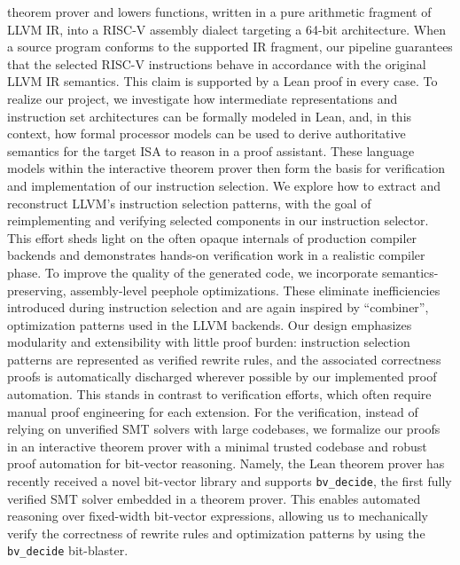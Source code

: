 \documentclass[review, anonymous, acmsmall, screen]{acmart}
\begin{document}
theorem prover and lowers functions, written in a pure arithmetic fragment of LLVM IR, into a RISC-V
assembly dialect targeting a 64-bit architecture.  When a source program conforms to the supported
IR fragment, our pipeline guarantees that the selected RISC-V instructions behave in accordance 
with the original LLVM IR semantics. This claim is supported by a Lean proof in every case. To realize our project, we investigate how intermediate representations and instruction set 
architectures can be formally modeled in Lean, and, in this context, how formal processor models 
can be used to derive authoritative semantics for the target ISA to reason in a proof assistant. 
These language models within the interactive theorem prover then form the basis for verification and 
implementation of our instruction selection. We explore how to extract and reconstruct LLVM’s 
instruction selection patterns, with the goal of reimplementing and verifying selected components 
in our instruction selector. This effort sheds light on the often opaque internals of production 
compiler backends and demonstrates hands-on verification work in a realistic compiler phase. To 
improve the quality of the generated code, we incorporate semantics-preserving, assembly-level 
peephole optimizations. These eliminate inefficiencies introduced during instruction selection and
are again inspired by ``combiner'', optimization patterns used in the LLVM backends.\newline
Our design emphasizes modularity and extensibility with little proof burden: instruction selection 
patterns are represented as verified rewrite rules, and the associated correctness proofs is 
automatically discharged wherever possible by our implemented proof automation. This stands in 
contrast to verification efforts, which often require  manual proof engineering for each extension. 
For the verification, instead of relying on unverified SMT solvers with large codebases, we formalize
our proofs in an interactive theorem prover with a minimal trusted codebase and robust proof automation
for bit-vector reasoning.\newline
Namely, the Lean theorem prover has recently received a novel bit-vector library and 
supports \texttt{bv\_decide}, the first fully verified SMT solver embedded in a 
theorem prover. This enables automated reasoning over fixed-width bit-vector expressions, 
allowing us to mechanically verify the correctness of rewrite rules and optimization patterns by 
using the \texttt{bv\_decide} bit-blaster.
\end{document}
